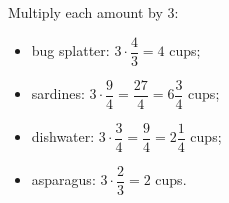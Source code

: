 Multiply each amount by $3$:
\begin{itemize}
\item bug splatter: $3\cdot\dfrac43=\boxed{4}$ cups;
\item sardines: $3\cdot\dfrac94=\dfrac{27}{4}=\boxed{6\dfrac34}$ cups;
\item dishwater: $3\cdot\dfrac34=\dfrac94=\boxed{2\dfrac14}$ cups;
\item asparagus: $3\cdot\dfrac23=\boxed{2}$ cups.
\end{itemize}
